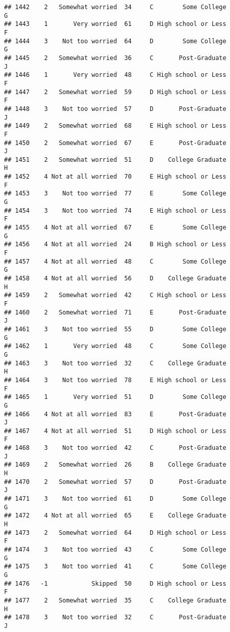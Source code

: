 \documentclass[
]{article}
\begin{document}
\begin{verbatim}
## 1442    2   Somewhat worried  34     C        Some College         G
## 1443    1       Very worried  61     D High school or Less         F
## 1444    3    Not too worried  64     D        Some College         G
## 1445    2   Somewhat worried  36     C       Post-Graduate         J
## 1446    1       Very worried  48     C High school or Less         F
## 1447    2   Somewhat worried  59     D High school or Less         F
## 1448    3    Not too worried  57     D       Post-Graduate         J
## 1449    2   Somewhat worried  68     E High school or Less         F
## 1450    2   Somewhat worried  67     E       Post-Graduate         J
## 1451    2   Somewhat worried  51     D    College Graduate         H
## 1452    4 Not at all worried  70     E High school or Less         F
## 1453    3    Not too worried  77     E        Some College         G
## 1454    3    Not too worried  74     E High school or Less         F
## 1455    4 Not at all worried  67     E        Some College         G
## 1456    4 Not at all worried  24     B High school or Less         F
## 1457    4 Not at all worried  48     C        Some College         G
## 1458    4 Not at all worried  56     D    College Graduate         H
## 1459    2   Somewhat worried  42     C High school or Less         F
## 1460    2   Somewhat worried  71     E       Post-Graduate         J
## 1461    3    Not too worried  55     D        Some College         G
## 1462    1       Very worried  48     C        Some College         G
## 1463    3    Not too worried  32     C    College Graduate         H
## 1464    3    Not too worried  78     E High school or Less         F
## 1465    1       Very worried  51     D        Some College         G
## 1466    4 Not at all worried  83     E       Post-Graduate         J
## 1467    4 Not at all worried  51     D High school or Less         F
## 1468    3    Not too worried  42     C       Post-Graduate         J
## 1469    2   Somewhat worried  26     B    College Graduate         H
## 1470    2   Somewhat worried  57     D       Post-Graduate         J
## 1471    3    Not too worried  61     D        Some College         G
## 1472    4 Not at all worried  65     E    College Graduate         H
## 1473    2   Somewhat worried  64     D High school or Less         F
## 1474    3    Not too worried  43     C        Some College         G
## 1475    3    Not too worried  41     C        Some College         G
## 1476   -1            Skipped  50     D High school or Less         F
## 1477    2   Somewhat worried  35     C    College Graduate         H
## 1478    3    Not too worried  32     C       Post-Graduate         J

\end{verbatim}
\end{document}

